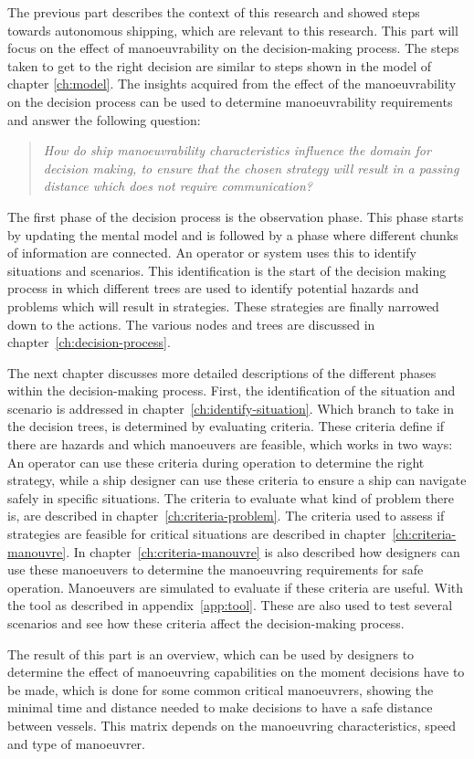 The previous part describes the context of this research and showed steps towards autonomous shipping, which are relevant to this research. This part will focus on the effect of manoeuvrability on the decision-making process. The steps taken to get to the right decision are similar to steps shown in the model of chapter \ref{ch:model}. The insights acquired from the effect of the manoeuvrability on the decision process can be used to determine manoeuvrability requirements and answer the following question:

\begin{quotation}
	\emph{How do ship manoeuvrability characteristics influence the domain for decision making, to ensure that the chosen strategy will result in a passing distance which does not require communication?} 
\end{quotation}

The first phase of the decision process is the observation phase. This phase starts by updating the mental model and is followed by a phase where different chunks of information are connected. An operator or system uses this to identify situations and scenarios. This identification is the start of the decision making process in which different trees are used to identify potential hazards and problems which will result in strategies. These strategies are finally narrowed down to the actions. The various nodes and trees are discussed in chapter~\ref{ch:decision-process}. 

The next chapter discusses more detailed descriptions of the different phases within the decision-making process. First, the identification of the situation and scenario is addressed in chapter~\ref{ch:identify-situation}.
Which branch to take in the decision trees, is determined by evaluating criteria. These criteria define if there are hazards and which manoeuvers are feasible, which works in two ways: An operator can use these criteria during operation to determine the right strategy, while a ship designer can use these criteria to ensure a ship can navigate safely in specific situations. The criteria to evaluate what kind of problem there is, are described in chapter~\ref{ch:criteria-problem}. The criteria used to assess if strategies are feasible for critical situations are described in chapter~\ref{ch:criteria-manouvre}. In chapter~\ref{ch:criteria-manouvre} is also described how designers can use these manoeuvers to determine the manoeuvring requirements for safe operation. Manoeuvers are simulated to evaluate if these criteria are useful. With the tool as described in appendix~\ref{app:tool}. These are also used to test several scenarios and see how these criteria affect the decision-making process.

The result of this part is an overview, which can be used by designers to determine the effect of manoeuvring capabilities on the moment decisions have to be made, which is done for some common critical manoeuvrers, showing the minimal time and distance needed to make decisions to have a safe distance between vessels. This matrix depends on the manoeuvring characteristics, speed and type of manoeuvrer.